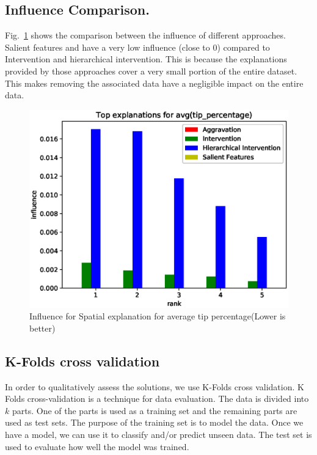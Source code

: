 \subsection{Influence Comparison.}
Fig.~\ref{fig:influence_comparison} shows the comparison between the influence of different approaches. Salient features and {\aggravation} have a very low influence (close to 0) compared to Intervention and hierarchical intervention. This is because the explanations provided by those approaches cover a very small portion of the entire dataset. This makes removing the associated data have a negligible impact on the entire data.
\begin{figure}[h]
	\includegraphics[width=\columnwidth]{images/Top_explanations_for_avg_tip_percentage_influence}
	\caption{Influence for Spatial explanation for average tip percentage(Lower is better)}
	\label{fig:influence_comparison}
\end{figure}

\subsection{K-Folds cross validation}
In order to qualitatively assess the solutions, we use K-Folds cross validation\cite{refaeilzadeh2009cross}. 
K Folds cross-validation is a technique for data evaluation\cite{kohavi1995study,refaeilzadeh2009cross}. The data is divided into $k$ parts. One of the parts is used as a training set and the remaining parts are used as test sets. The purpose of the training set is to model the data. Once we have a model, we can use it to classify and/or predict unseen data. The test set is used to evaluate how well the model was trained.

